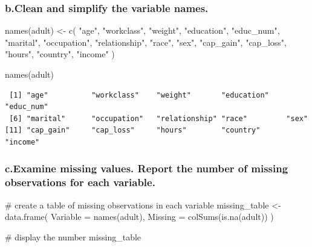 \documentclass[
  letterpaper,
  DIV=11,
  numbers=noendperiod]{scrartcl}
\newenvironment{Shaded}{\begin{snugshade}}{\end{snugshade}}
\newcommand{\AttributeTok}[1]{\textcolor[rgb]{0.40,0.45,0.13}{#1}}
\newcommand{\CommentTok}[1]{\textcolor[rgb]{0.37,0.37,0.37}{#1}}
\newcommand{\FunctionTok}[1]{\textcolor[rgb]{0.28,0.35,0.67}{#1}}
\newcommand{\NormalTok}[1]{\textcolor[rgb]{0.00,0.23,0.31}{#1}}
\newcommand{\OtherTok}[1]{\textcolor[rgb]{0.00,0.23,0.31}{#1}}
\newcommand{\StringTok}[1]{\textcolor[rgb]{0.13,0.47,0.30}{#1}}
\begin{document}
\subsubsection{b.Clean and simplify the variable
names.}\label{b.clean-and-simplify-the-variable-names.}

\begin{Shaded}
\begin{Highlighting}[]
\FunctionTok{names}\NormalTok{(adult) }\OtherTok{\textless{}{-}} \FunctionTok{c}\NormalTok{(}
  \StringTok{"age"}\NormalTok{,}
  \StringTok{"workclass"}\NormalTok{,}
  \StringTok{"weight"}\NormalTok{,}
  \StringTok{"education"}\NormalTok{,}
  \StringTok{"educ\_num"}\NormalTok{,}
  \StringTok{"marital"}\NormalTok{,}
  \StringTok{"occupation"}\NormalTok{,}
  \StringTok{"relationship"}\NormalTok{,}
  \StringTok{"race"}\NormalTok{,}
  \StringTok{"sex"}\NormalTok{,}
  \StringTok{"cap\_gain"}\NormalTok{,}
  \StringTok{"cap\_loss"}\NormalTok{,}
  \StringTok{"hours"}\NormalTok{,}
  \StringTok{"country"}\NormalTok{,}
  \StringTok{"income"}
\NormalTok{)}

\FunctionTok{names}\NormalTok{(adult)}
\end{Highlighting}
\end{Shaded}

\begin{verbatim}
 [1] "age"          "workclass"    "weight"       "education"    "educ_num"    
 [6] "marital"      "occupation"   "relationship" "race"         "sex"         
[11] "cap_gain"     "cap_loss"     "hours"        "country"      "income"      
\end{verbatim}

\subsubsection{c.Examine missing values. Report the number of missing
observations for each
variable.}\label{c.examine-missing-values.-report-the-number-of-missing-observations-for-each-variable.}

\begin{Shaded}
\begin{Highlighting}[]
\CommentTok{\# create a table of missing observations in each variable}
\NormalTok{missing\_table }\OtherTok{\textless{}{-}} \FunctionTok{data.frame}\NormalTok{(}
  \AttributeTok{Variable =} \FunctionTok{names}\NormalTok{(adult),}
  \AttributeTok{Missing =} \FunctionTok{colSums}\NormalTok{(}\FunctionTok{is.na}\NormalTok{(adult))}
\NormalTok{)}

\CommentTok{\# display the number}
\NormalTok{missing\_table}
\end{Highlighting}
\end{Shaded}
\end{document}
